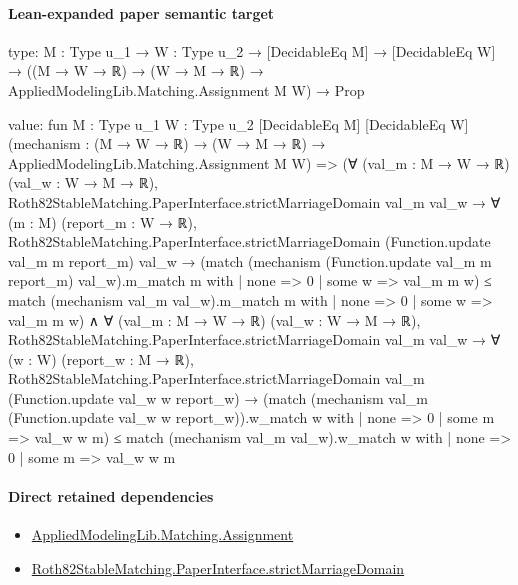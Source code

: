\documentclass[10pt]{article}
\begin{document}
\paragraph{Lean-expanded paper semantic target}
\begin{ReviewVerbatim}
type:
{M : Type u_1} →
  {W : Type u_2} →
    [DecidableEq M] → [DecidableEq W] → ((M → W → ℝ) → (W → M → ℝ) → AppliedModelingLib.Matching.Assignment M W) → Prop

value:
fun {M : Type u_1} {W : Type u_2} [DecidableEq M] [DecidableEq W]
    (mechanism : (M → W → ℝ) → (W → M → ℝ) → AppliedModelingLib.Matching.Assignment M W) =>
  (∀ (val_m : M → W → ℝ) (val_w : W → M → ℝ),
      Roth82StableMatching.PaperInterface.strictMarriageDomain val_m val_w →
        ∀ (m : M) (report_m : W → ℝ),
          Roth82StableMatching.PaperInterface.strictMarriageDomain (Function.update val_m m report_m) val_w →
            (match (mechanism (Function.update val_m m report_m) val_w).m_match m with
              | none => 0
              | some w => val_m m w) ≤
              match (mechanism val_m val_w).m_match m with
              | none => 0
              | some w => val_m m w) ∧
    ∀ (val_m : M → W → ℝ) (val_w : W → M → ℝ),
      Roth82StableMatching.PaperInterface.strictMarriageDomain val_m val_w →
        ∀ (w : W) (report_w : M → ℝ),
          Roth82StableMatching.PaperInterface.strictMarriageDomain val_m (Function.update val_w w report_w) →
            (match (mechanism val_m (Function.update val_w w report_w)).w_match w with
              | none => 0
              | some m => val_w w m) ≤
              match (mechanism val_m val_w).w_match w with
              | none => 0
              | some m => val_w w m
\end{ReviewVerbatim}

\paragraph{Direct retained dependencies}
\begin{itemize}\raggedright
\item \hyperlink{governing-declaration-508c084086b006b8}{Applied\allowbreak{}Modeling\allowbreak{}Lib.\allowbreak{}Matching.\allowbreak{}Assignment}
\item \hyperlink{governing-declaration-d06ec2a2987f0c72}{Roth82\allowbreak{}Stable\allowbreak{}Matching.\allowbreak{}Paper\allowbreak{}Interface.\allowbreak{}strict\allowbreak{}Marriage\allowbreak{}Domain}
\end{itemize}
\end{document}
